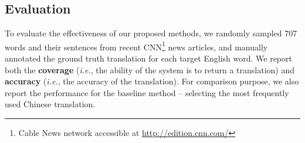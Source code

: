 \begin{CJK}{UTF8}{gbsn}


\subsection{Evaluation}
To evaluate the effectiveness of our proposed  methods, we randomly sampled 707 words and their sentences from recent CNN\footnote{Cable News network accessible at \url{http://edition.cnn.com/}} news articles, and manually annotated the ground truth translation for each target English word. We report both the {\bf coverage} ({\it i.e.}, the ability of the system is to return a translation) and {\bf accuracy} ({\it i.e.}, the accuracy of the translation). For comparison purpose, we also report the performance for the baseline method -- selecting the most frequently used Chinese translation.


\end{CJK}
